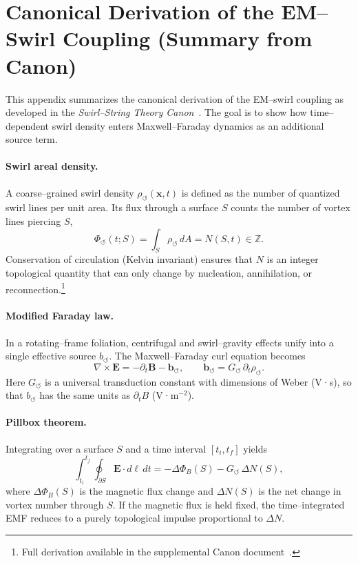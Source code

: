 \documentclass[reprint,aps,onecolumn,nofootinbib]{revtex4-2}
\begin{document}
\appendix

    \section{Canonical Derivation of the EM–Swirl Coupling (Summary from Canon)}
    \label{sec:canonical-derivation-of-the-emswirl-coupling}

        This appendix summarizes the canonical derivation of the EM–swirl coupling as developed in the
        \emph{Swirl–String Theory Canon}~\cite{Iskandarani_SST_Canon_v0_5_9_2025}. The goal is to show how
        time–dependent swirl density enters Maxwell–Faraday dynamics as an additional source term.

        \paragraph*{Swirl areal density.}
        A coarse–grained swirl density $\rho_{\circlearrowleft}(\mathbf{x},t)$ is defined as the number of
        quantized swirl lines per unit area. Its flux through a surface $S$ counts the number of vortex lines
        piercing $S$,
        \[
        \Phi_{\circlearrowleft}(t; S) = \int_S \rho_{\circlearrowleft} \, dA = N(S,t) \in \mathbb{Z}.
        \]
        Conservation of circulation (Kelvin invariant) ensures that $N$ is an integer topological quantity
        that can only change by nucleation, annihilation, or reconnection.\footnote{Full derivation available in the supplemental Canon document~\cite{Iskandarani_SST_Canon_v0_5_9_2025}.}

        \paragraph*{Modified Faraday law.}
        In a rotating–frame foliation, centrifugal and swirl–gravity effects unify into a single effective
        source $b_{\circlearrowleft}$. The Maxwell–Faraday curl equation becomes
        \[
        \nabla \times \mathbf{E} = -\partial_t \mathbf{B} - \mathbf{b}_{\circlearrowleft},
        \qquad
        \mathbf{b}_{\circlearrowleft} = G_{\circlearrowleft} \, \partial_t \rho_{\circlearrowleft}.
        \]
        Here $G_{\circlearrowleft}$ is a universal transduction constant with dimensions of Weber (V·s), so that
        $b_{\circlearrowleft}$ has the same units as $\partial_t B$ (V·m$^{-2}$).

        \paragraph*{Pillbox theorem.}
        Integrating over a surface $S$ and a time interval $[t_i,t_f]$ yields
        \[
        \int_{t_i}^{t_f} \!\! \oint_{\partial S} \mathbf{E}\cdot d\ell \, dt
        = - \Delta \Phi_B(S) - G_{\circlearrowleft}\, \Delta N(S),
        \]
        where $\Delta \Phi_B(S)$ is the magnetic flux change and $\Delta N(S)$ is the net change in vortex
        number through $S$. If the magnetic flux is held fixed, the time–integrated EMF reduces to a purely
        topological impulse proportional to $\Delta N$.
\end{document}

